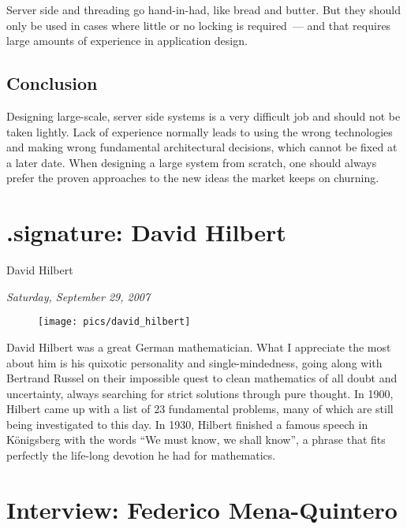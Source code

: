 \documentclass{memoir}
\begin{document}
Server side and threading go hand-in-had, like bread and butter. But
they should only be used in cases where little or no locking is
required~--- and that requires large amounts of experience in
application design.

\section{Conclusion}

Designing large-scale, server side systems is a very difficult job and
should not be taken lightly. Lack of experience normally leads to
using the wrong technologies and making wrong fundamental
architectural decisions, which cannot be fixed at a later date. When
designing a large system from scratch, one should always prefer the
proven approaches to the new ideas the market keeps on churning.

\chapter{.signature: David Hilbert}

\begin{epigraphs}
      {David Hilbert}
\end{epigraphs}

\begin{flushright}
  \emph{Saturday, September 29, 2007}
\end{flushright}

\begin{figure}
\begin{center}
\texttt{[image: pics/david\_hilbert]}
\end{center}
\end{figure}

David Hilbert was a great German mathematician. What I appreciate the
most about him is his quixotic personality and single-mindedness,
going along with Bertrand Russel on their impossible quest to clean
mathematics of all doubt and uncertainty, always searching for strict
solutions through pure thought. In 1900, Hilbert came up with a list
of 23 fundamental problems, many of which are still being investigated
to this day. In 1930, Hilbert finished a famous speech in Königsberg
with the words ``We must know, we shall know'', a phrase that fits
perfectly the life-long devotion he had for mathematics.

\chapter{Interview: Federico Mena-Quintero}
\end{document}
